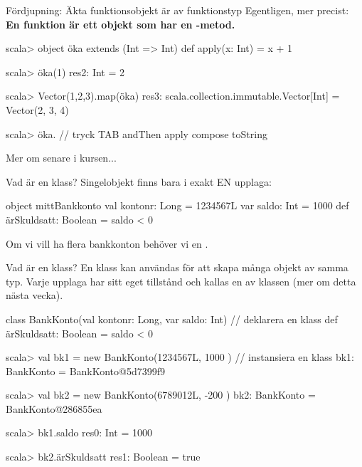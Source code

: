 \begin{Slide}{Fördjupning: Äkta funktionsobjekt är av funktionstyp}
Egentligen, mer precist:\\
\textbf{En funktion är ett objekt  som har en -metod.}
\pause
\begin{REPLnonum}
scala> object öka extends (Int => Int) {
         def apply(x: Int) = x + 1
       }

scala> öka(1)
res2: Int = 2

scala> Vector(1,2,3).map(öka)
res3: scala.collection.immutable.Vector[Int] = Vector(2, 3, 4)

scala> öka.   // tryck TAB
andThen   apply   compose   toString
\end{REPLnonum}
Mer om  senare i kursen... %
\end{Slide}




\begin{Slide}{Vad är en klass?}
Singelobjekt finns bara i exakt EN upplaga:
\begin{Code}[basicstyle=\ttfamily\fontsize{9}{11}\selectfont]
object mittBankkonto {
  val kontonr: Long        = 1234567L
  var saldo: Int           = 1000
  def ärSkuldsatt: Boolean = saldo < 0
}
\end{Code}
Om vi vill ha flera bankkonton behöver vi en  .
\end{Slide}

\begin{Slide}{Vad är en klass?}
En klass kan användas för att skapa många objekt av samma typ. Varje upplaga har sitt eget tillstånd och kallas en  av klassen (mer om detta nästa vecka).
\begin{Code}
class BankKonto(val kontonr: Long, var saldo: Int)  {  // deklarera en klass
  def ärSkuldsatt: Boolean = saldo < 0
}
\end{Code}
\pause
\begin{REPL}
scala> val bk1 = new BankKonto(1234567L, 1000 )   // instansiera en klass
bk1: BankKonto = BankKonto@5d7399f9

scala> val bk2 = new BankKonto(6789012L, -200 )
bk2: BankKonto = BankKonto@286855ea

scala> bk1.saldo
res0: Int = 1000

scala> bk2.ärSkuldsatt
res1: Boolean = true
\end{REPL}
\end{Slide}

